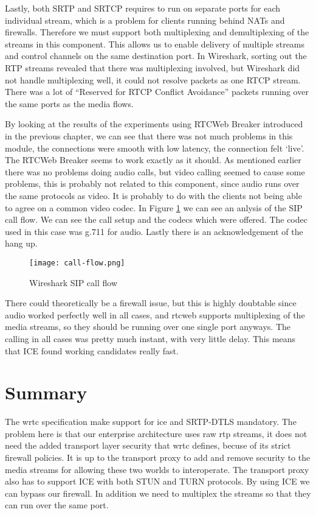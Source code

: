 Lastly, both SRTP and SRTCP requires to run on separate ports for each individual stream, which is a problem for clients running behind NATs and firewalls. Therefore we must support both multiplexing and demultiplexing of the streams in this component. This allows us to enable delivery of multiple streams and control channels on the same destination port. In Wireshark, sorting out the RTP streams revealed that there was multiplexing involved, but Wireshark did not handle multiplexing well, it could not resolve packets as one RTCP stream. There was a lot of ``Reserved for RTCP Conflict Avoidance'' packets running over the same ports as the media flows.

By looking at the results of the experiments using RTCWeb Breaker introduced in the previous chapter, we can see that there was not much problems in this module, the connections were smooth with low latency, the connection felt `live'. The RTCWeb Breaker seems to work exactly as it should. As mentioned earlier there was no problems doing audio calls, but video calling seemed to cause some problems, this is probably not related to this component, since audio runs over the same protocols as video. It is probably to do with the clients not being able to agree on a common video codec. In Figure \ref{fig:wireshark-sip-call-flow} we can see an anlysis of the SIP call flow. We can see the call setup and the codecs which were offered. The codec used in this case was g.711 for audio. Lastly there is an acknowledgement of the hang up.

\begin{figure}[here]
\centerline{\texttt{[image: call-flow.png]}}
\caption{Wireshark SIP call flow}
\label{fig:wireshark-sip-call-flow}
\end{figure}

There could theoretically be a firewall issue, but this is highly doubtable since audio worked perfectly well in all cases, and \gls{rtcweb} supports multiplexing of the media streams, so they should be running over one single port anyways. The calling in all cases was pretty much instant, with very little delay. This means that ICE found working candidates really fast.

\newpage
\section{Summary}
The \gls{wrtc} specification make support for \gls{ice} and SRTP-DTLS mandatory. The problem here is that our enterprise architecture uses raw \gls{rtp} streams, it does not need the added transport layer security that \gls{wrtc} defines, becuse of its strict firewall policies. It is up to the transport proxy to add and remove security to the media streams for allowing these two worlds to interoperate. The transport proxy also has to support ICE with both STUN and TURN protocols. By using ICE we can bypass our firewall. In addition we need to multiplex the streams so that they can run over the same port.